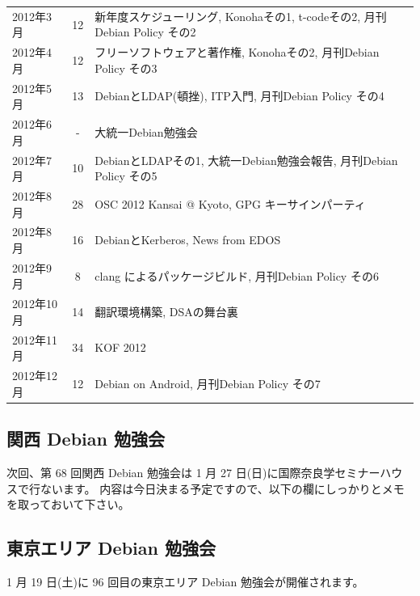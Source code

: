 \documentclass[mingoth,a4paper]{jsarticle}
\begin{document}
\begin{table}
\begin{center}
\begin{tabular}{|l|c|l|}
        2012年3月 &12        & 新年度スケジューリング, Konohaその1, t-codeその2, 月刊Debian Policy その2 \\
        2012年4月 &12        & フリーソフトウェアと著作権, Konohaその2, 月刊Debian Policy その3 \\
        2012年5月 &13        & DebianとLDAP(頓挫), ITP入門, 月刊Debian Policy その4 \\
        2012年6月 & -        & 大統一Debian勉強会 \\
        2012年7月 &10        & DebianとLDAPその1, 大統一Debian勉強会報告, 月刊Debian Policy その5 \\
        2012年8月 &28        & OSC 2012 Kansai @ Kyoto, GPG キーサインパーティ\\
        2012年8月 &16        & DebianとKerberos, News from EDOS \\
        2012年9月 & 8        & clang によるパッケージビルド, 月刊Debian Policy その6 \\
        2012年10月&14        & 翻訳環境構築, DSAの舞台裏\\
        2012年11月&34        & KOF 2012\\
        2012年12月&12        & Debian on Android, 月刊Debian Policy その7 \\
        \hline
      \end{tabular}
    \end{center}
\end{table}

\clearpage


\subsection{関西 Debian 勉強会}

次回、第 68 回関西 Debian 勉強会は 1 月 27 日(日)に国際奈良学セミナーハウスで行ないます。
内容は今日決まる予定ですので、以下の欄にしっかりとメモを取っておいて下さい。
\begin{screen}
  \vspace{5em}
\end{screen}

\subsection{東京エリア Debian 勉強会}
1 月 19 日(土)に 96 回目の東京エリア Debian 勉強会が開催されます。
\end{document}
